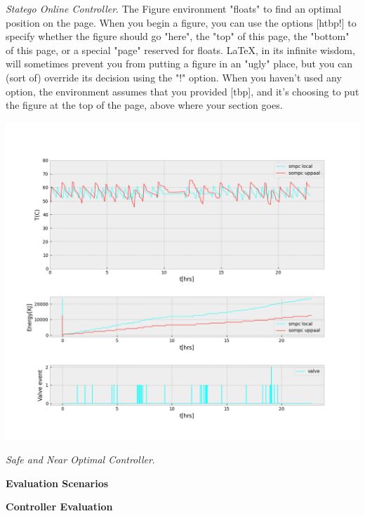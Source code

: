 \emph{Statego Online Controller}.
The Figure environment "floats" to find an optimal position on the page. When you begin a figure, you can use the options [htbp!] to specify whether the figure should go "here", the "top" of this page, the "bottom" of this page, or a special "page" reserved for floats. LaTeX, in its infinite wisdom, will sometimes prevent you from putting a figure in an "ugly" place, but you can (sort of) override its decision using the "!" option. When you haven't used any option, the environment assumes that you provided [tbp], and it's choosing to put the figure at the top of the page, above where your section goes.
\begin{minipage}{\linewidth}
    \begin{center}
        \includegraphics[width=1.0\linewidth]{images/Simulation}
    \end{center}
\end{minipage}

\emph{Safe and Near Optimal Controller}.


\textbf{Evaluation Scenarios}

\textbf{Controller Evaluation}

